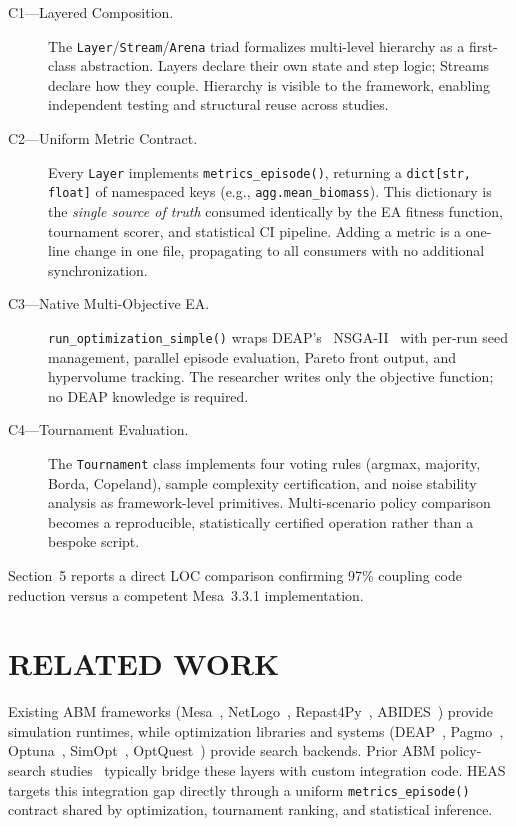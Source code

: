 \documentclass{wscpaperproc}
\begin{document}
\begin{description}
  \item[C1---Layered Composition.] The \texttt{Layer}/\texttt{Stream}/\texttt{Arena}
    triad formalizes multi-level hierarchy as a first-class abstraction. Layers
    declare their own state and step logic; Streams declare how they couple.
    Hierarchy is visible to the framework, enabling independent testing and
    structural reuse across studies.

  \item[C2---Uniform Metric Contract.] Every \texttt{Layer} implements
    \texttt{metrics\_episode()}, returning a \texttt{dict[str, float]} of
    namespaced keys (e.g., \texttt{agg.mean\_biomass}). This dictionary is the
    \emph{single source of truth} consumed identically by the EA fitness
    function, tournament scorer, and statistical CI pipeline. Adding a metric is
    a one-line change in one file, propagating to all consumers with no
    additional synchronization.

  \item[C3---Native Multi-Objective EA.] \texttt{run\_optimization\_simple()}
    wraps DEAP's~\cite{fortin2012deap} NSGA-II~\cite{deb2002nsga2} with
    per-run seed management, parallel episode evaluation, Pareto front output,
    and hypervolume tracking. The researcher writes only the objective function;
    no DEAP knowledge is required.

  \item[C4---Tournament Evaluation.] The \texttt{Tournament} class implements
    four voting rules (argmax, majority, Borda, Copeland), sample complexity
    certification, and noise stability analysis as framework-level primitives.
    Multi-scenario policy comparison becomes a reproducible, statistically
    certified operation rather than a bespoke script.
\end{description}

Section~5 reports a direct LOC comparison confirming 97\% coupling code
reduction versus a competent Mesa~3.3.1 implementation.

\section{RELATED WORK}

Existing ABM frameworks (Mesa~\cite{kazil2020mesa}, NetLogo~\cite{wilensky1999netlogo},
Repast4Py~\cite{collier2022repast4py}, ABIDES~\cite{byrd2020abides}) provide
simulation runtimes, while optimization libraries and systems (DEAP~\cite{fortin2012deap},
Pagmo~\cite{biscani2020pagmo}, Optuna~\cite{akiba2019optuna},
SimOpt~\cite{pasupathy2011simopt}, OptQuest~\cite{optquest2007}) provide search
backends. Prior ABM policy-search studies~\cite{pangallo2019best,capri2023transport,zheng2022aieconomist}
typically bridge these layers with custom integration code. HEAS targets this
integration gap directly through a uniform \texttt{metrics\_episode()} contract
shared by optimization, tournament ranking, and statistical inference.
\end{document}
